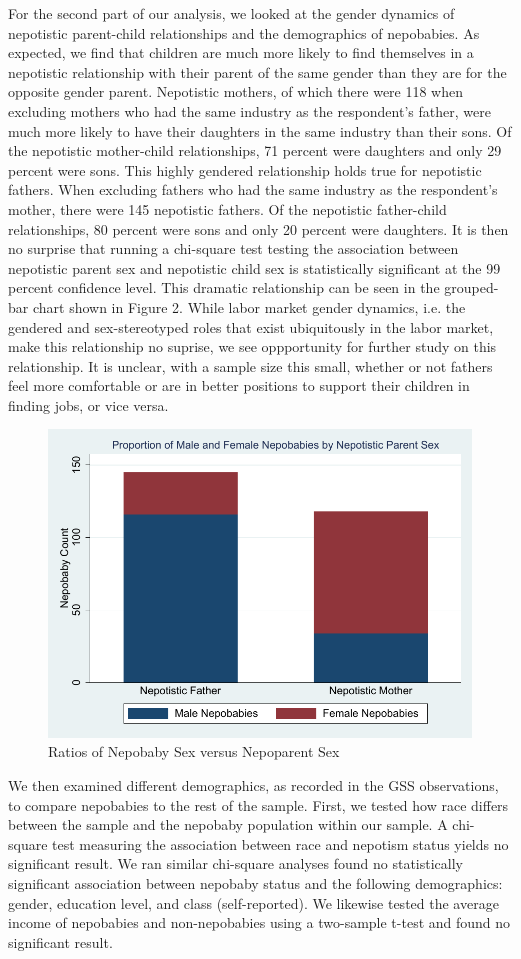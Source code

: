 \documentclass[12pt]{article}
\begin{document}
For the second part of our analysis, we looked at the gender dynamics of nepotistic parent-child relationships and the demographics of nepobabies. As expected, we find that children are much more likely to find themselves in a nepotistic relationship with their parent of the same gender than they are for the opposite gender parent. Nepotistic mothers, of which there were 118 when excluding mothers who had the same industry as the respondent’s father, were much more likely to have their daughters in the same industry than their sons. Of the nepotistic mother-child relationships, 71 percent were daughters and only 29 percent were sons. This highly gendered relationship holds true for nepotistic fathers. When excluding fathers who had the same industry as the respondent’s mother, there were 145 nepotistic fathers. Of the nepotistic father-child relationships, 80 percent were sons and only 20 percent were daughters. It is then no surprise that running a chi-square test testing the association between nepotistic parent sex and nepotistic child sex is statistically significant at the 99 percent confidence level. This dramatic relationship can be seen in the grouped-bar chart shown in Figure 2. While labor market gender dynamics, i.e. the gendered and sex-stereotyped roles that exist ubiquitously in the labor market, make this relationship no suprise, we see oppportunity for further study on this relationship. It is unclear, with a sample size this small, whether or not fathers feel more comfortable or are in better positions to support their children in finding jobs, or vice versa.

\begin{figure}
    \centering
    \includegraphics[width=0.65\linewidth]{Nepoparent.sexproportions.pdf}
    \caption{Ratios of Nepobaby Sex versus Nepoparent Sex}
    \label{fig:enter-label}
\end{figure}


We then examined different demographics, as recorded in the GSS observations, to compare nepobabies to the rest of the sample. First, we tested how race differs between the sample and the nepobaby population within our sample. A chi-square test measuring the association between race and nepotism status yields no significant result. We ran similar chi-square analyses found no statistically significant association between nepobaby status and the following demographics: gender, education level, and class (self-reported). We likewise tested the average income of nepobabies and non-nepobabies using a two-sample t-test and found no significant result.
\end{document}
